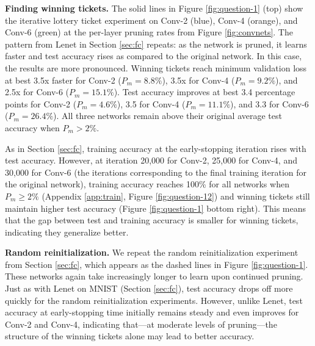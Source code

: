 \textbf{Finding winning tickets.} The solid lines in Figure \ref{fig:question-1} (top) show the iterative lottery ticket experiment on
Conv-2 (blue), Conv-4 (orange), and Conv-6 (green) at the per-layer pruning rates from Figure \ref{fig:convnets}. The pattern
from Lenet in Section \ref{sec:fc} repeats: as the network is pruned, it learns faster and test accuracy rises as compared to the original network.
In this case, the results are more pronounced.
Winning tickets reach minimum validation loss at best 3.5x faster for Conv-2 ($P_m = 8.8\%$), 3.5x for Conv-4 ($P_m = 9.2\%$), and
2.5x for Conv-6 ($P_m = 15.1\%$). Test accuracy improves at best 3.4 percentage points for Conv-2 ($P_m = 4.6\%$), 3.5
for Conv-4 ($P_m = 11.1\%$), and 3.3 for Conv-6 ($P_m = 26.4\%$). All three networks remain above their original average test accuracy when $P_m > 2\%$.

As in Section \ref{sec:fc}, training accuracy at the early-stopping iteration rises with test accuracy.
However,  at iteration 20,000 for Conv-2, 25,000 for Conv-4, and 30,000 for Conv-6 (the iterations corresponding to the final training iteration for the original network), training accuracy reaches 100\% for all networks when $P_m \geq 2\%$ (Appendix \ref{app:train}, Figure \ref{fig:question-12})
and winning tickets still maintain higher test accuracy (Figure \ref{fig:question-1} bottom right). This means that the gap between
test and training accuracy is smaller for winning tickets, indicating they generalize better.

\textbf{Random reinitialization.} We repeat the random reinitialization experiment from Section \ref{sec:fc}, which appears as the dashed lines in Figure \ref{fig:question-1}. 
These networks again take increasingly longer to learn upon continued pruning. Just as with Lenet on MNIST (Section \ref{sec:fc}), test accuracy drops off more
quickly for the random reinitialization experiments. However, unlike Lenet, test accuracy at early-stopping time initially remains steady and even
improves for Conv-2 and Conv-4, indicating that---at moderate levels of pruning---the structure of the winning tickets alone may lead to better accuracy.